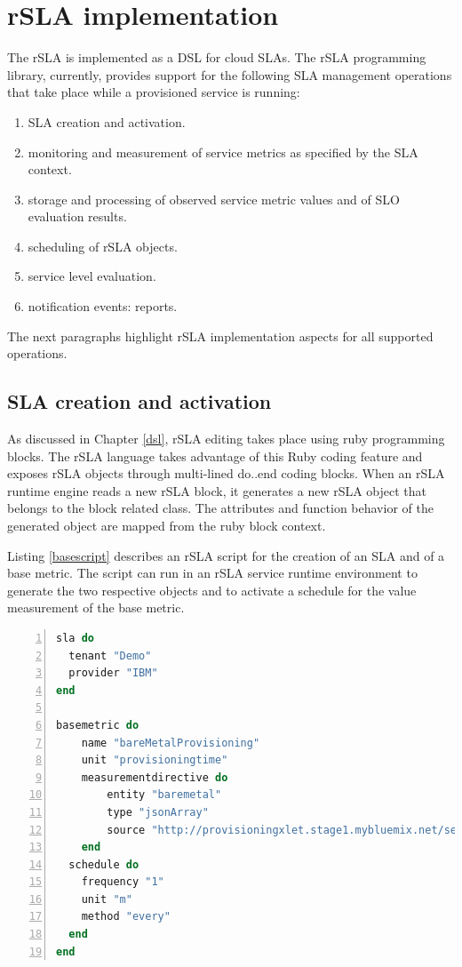 \section{rSLA implementation}\label{runtime} 

The rSLA is implemented as a DSL for cloud SLAs. The rSLA programming library, currently, provides support for the following SLA management operations that take place while a provisioned service is running:
\begin{enumerate}
\item SLA creation and activation.
\item monitoring and measurement of service metrics as specified by the SLA context.
\item storage and processing of observed service metric values and of SLO evaluation results. 
\item scheduling of rSLA objects.
\item service level evaluation.
\item notification events: reports.
\end{enumerate}
The next paragraphs highlight rSLA implementation aspects for all supported operations.

\subsection{SLA creation and activation}

As discussed in Chapter \ref{dsl}, rSLA editing takes place using ruby programming blocks. The rSLA language takes advantage of this Ruby coding feature and exposes rSLA objects through multi-lined do..end coding blocks. When an rSLA runtime engine reads a new rSLA block, it generates a new rSLA object that belongs to the block related class. The attributes and function behavior of the generated object are mapped from the ruby block context. 

Listing \ref{basescript} describes an rSLA script for the creation of an SLA and of a base metric. The script can run in an rSLA service runtime environment to generate the two respective objects and to activate a schedule for the value measurement of the base metric.

\begin{minipage}{0.9\textwidth}
\begin{lstlisting}[language=Ruby, basicstyle=\small\normalfont\sffamily, breaklines=true,  captionpos=b, mathescape=true, caption=rSLA SLA (lines 1-4) and basemetric (lines 6-19) creation script, label=basescript, numbers=left, numbersep=5pt, numberstyle=\tiny] 
sla do
  tenant "Demo"
  provider "IBM"
end  

basemetric do
    name "bareMetalProvisioning"
    unit "provisioningtime"
    measurementdirective do
    	entity "baremetal"
    	type "jsonArray"
    	source "http://provisioningxlet.stage1.mybluemix.net/server/baremetal/provisioningtime" 
  	end
  schedule do    
  	frequency "1"
    unit "m"
    method "every"
  end
end
\end{lstlisting}
\end{minipage} 

